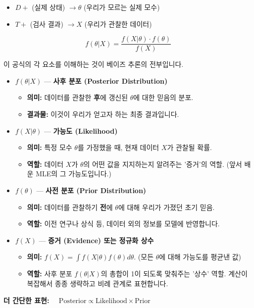 \documentclass[11pt,a4paper]{book}
\theoremstyle{definition}
\begin{document}
\begin{itemize}
    \item $D+$ (실제 상태) $\rightarrow \theta$ (우리가 모르는 실제 모수)
    \item $T+$ (검사 결과) $\rightarrow X$ (우리가 관찰한 데이터)
\end{itemize}

\begin{summarybox}[title=베이즈 추론 공식]
    $$ f(\theta | X) = \frac{f(X | \theta) \cdot f(\theta)}{f(X)} $$

    이 공식의 각 요소를 이해하는 것이 베이즈 추론의 전부입니다.

    \begin{itemize}
        \item $f(\theta | X)$ --- \textbf{사후 분포 (Posterior Distribution)}
            \begin{itemize}
                \item \textbf{의미:} 데이터를 관찰한 \textbf{후}에 갱신된 $\theta$에 대한 믿음의 분포.
                \item \textbf{결과물:} 이것이 우리가 얻고자 하는 최종 결과입니다.
            \end{itemize}
        \item $f(X | \theta)$ --- \textbf{가능도 (Likelihood)}
            \begin{itemize}
                \item \textbf{의미:} 특정 모수 $\theta$를 가정했을 때, 현재 데이터 $X$가 관찰될 확률.
                \item \textbf{역할:} 데이터 $X$가 $\theta$의 어떤 값을 지지하는지 알려주는 '증거'의 역할. (앞서 배운 MLE의 그 가능도입니다.)
            \end{itemize}
        \item $f(\theta)$ --- \textbf{사전 분포 (Prior Distribution)}
            \begin{itemize}
                \item \textbf{의미:} 데이터를 관찰하기 \textbf{전}에 $\theta$에 대해 우리가 가졌던 초기 믿음.
                \item \textbf{역할:} 이전 연구나 상식 등, 데이터 외의 정보를 모델에 반영합니다.
            \end{itemize}
        \item $f(X)$ --- \textbf{증거 (Evidence) 또는 정규화 상수}
            \begin{itemize}
                \item \textbf{의미:} $f(X) = \int f(X|\theta)f(\theta) d\theta$. (모든 $\theta$에 대해 가능도를 평균낸 값)
                \item \textbf{역할:} 사후 분포 $f(\theta|X)$의 총합이 1이 되도록 맞춰주는 '상수' 역할. 계산이 복잡해서 종종 생략하고 비례 관계로 표현합니다.
            \end{itemize}
    \end{itemize}

    \textbf{더 간단한 표현: $\quad \text{Posterior} \propto \text{Likelihood} \times \text{Prior}$}
\end{summarybox}
\end{document}
